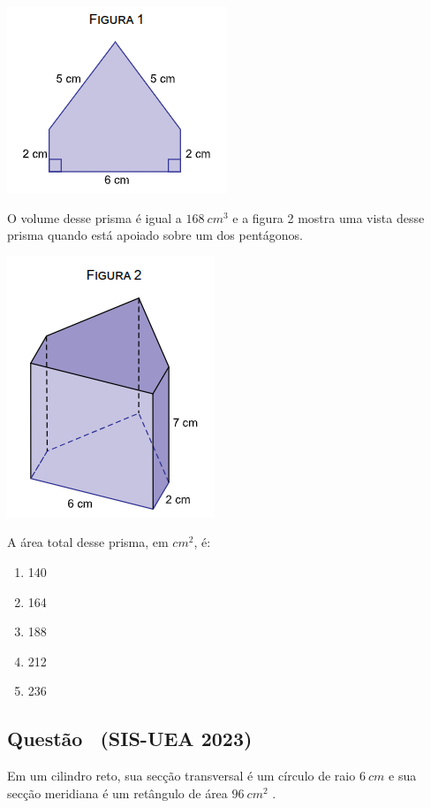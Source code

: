 \documentclass[12pt]{article}
\newif\ifmostravermelho
\newcommand{\vermelho}[1]{%
  \ifmostravermelho
    {\color{red}#1}%
  \else
    #1%
  \fi
}
\newcounter{questao}
\newcommand{\novaquestao}[1]{%
  \stepcounter{questao}%
  \subsection*{Questão \thequestao\ (#1)}%
}
\begin{document}
\begin{multicols}{2}
            \begin{center}
                \includegraphics[scale=0.6]{q1-fig1.png}
            \end{center} O volume desse prisma é igual a $168\ cm^{3}$ e a figura 2 mostra uma vista desse prisma quando está apoiado sobre um dos pentágonos.

            \begin{center}
                \includegraphics[scale=0.6]{q1-fig2.png} 
            \end{center} A área total desse prisma, em $cm^{2}$, é:
        
            \begin{enumerate}[label=(\alph*), noitemsep]
                \item 140
                \item 164
                \item \vermelho{188} %
                \item 212
                \item 236
            \end{enumerate}

        \novaquestao{SIS-UEA 2023}
            Em um cilindro reto, sua secção transversal é um círculo de raio $6\ cm$ e sua secção meridiana é um retângulo de área $96\ cm^{2}$ .


\end{multicols}
\end{document}
